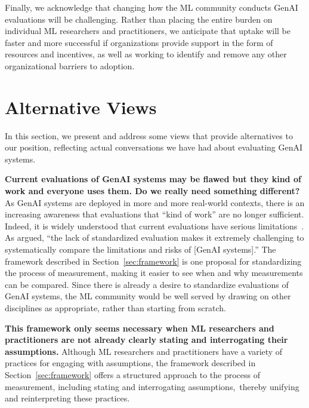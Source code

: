 \documentclass{article}
\begin{document}
Finally, we acknowledge that changing how the ML community conducts GenAI evaluations will be challenging. Rather than placing the entire burden on individual ML researchers and practitioners, we anticipate that uptake will be faster and more successful if organizations provide support in the form of resources and incentives, as well as working to identify and remove any other organizational barriers to adoption.

\section{Alternative Views}
\label{sec:alternative_views}

In this section, we present and address some views that provide alternatives to our position, reflecting actual conversations we have had about evaluating GenAI systems.

\textbf{Current evaluations of GenAI systems may be flawed but they kind of work and everyone uses them. Do we really need something different?} As GenAI systems are deployed in more and more real-world contexts, there is an increasing awareness that evaluations that ``kind of work'' are no longer sufficient. Indeed, it is widely understood that current evaluations have serious limitations~\citep[e.g.,][]{raji2021widebenchmark,hutchinson2022evaluationgaps, rauh2024gaps, roose2024ai, eriksson2025can, brandom2025}. As \citet{maslej2024ai} argued, ``the lack of standardized evaluation makes it extremely challenging to systematically compare the limitations and risks of [GenAI systems].'' The framework described in Section~\ref{sec:framework} is one proposal for standardizing the process of measurement, making it easier to see when and why measurements can be compared. Since there is already a desire to standardize evaluations of GenAI systems, the ML community would be well served by drawing on other disciplines as appropriate, rather than starting from scratch.

\textbf{This framework only seems necessary when ML researchers and practitioners are not already clearly stating and interrogating their assumptions.} 
Although ML researchers and practitioners have a variety of practices for engaging with assumptions, the framework described in Section~\ref{sec:framework} offers a structured approach to the process of measurement, including stating and interrogating assumptions,~thereby unifying and reinterpreting these practices.
\end{document}
